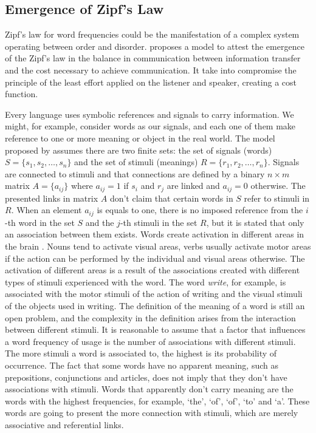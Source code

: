 \subsection{Emergence of Zipf's Law}
Zipf’s law for word frequencies could be the manifestation of a complex system 
operating between order and disorder. \cite{ramon2003,cancho2005} proposes a model to attest the
emergence of the Zipf's law in the balance in communication between information
transfer and the cost necessary to achieve communication. It take into compromise the principle of the least 
effort applied on the listener and speaker, creating a cost function.

Every language uses symbolic references and signals to carry information.
We might, for example, consider words as our signals, and each one of them
make reference to one or more meaning or object in the real world.
The model proposed by \cite{ramon2003,cancho2005} assumes there are two finite sets:
the set of signals (words) $S = \{ s_1, s_2, \ldots , s_n \}$ and the set of 
stimuli (meanings) $R = \{ r_1, r_2, \ldots , r_n \}$. Signals are connected
to stimuli and that connections are defined by a binary $n \times m$ matrix
$A = \{ a_{ij} \}$ where $a_{ij} = 1$ if $s_i$ and $r_j$ are linked and
$a_{ij} = 0$ otherwise. The presented links in matrix $A$ don't claim that certain
words in $S$ refer to stimuli in $R$. When an element $a_{ij}$ is equals to one,
there is no imposed reference from the $i$-th word in the set $S$ and the
$j$-th stimuli in the set $R$, but it is stated that only an association between them exists.
Words create activation in different areas in the brain \citep{pulvermuller2003}. 
Nouns tend to activate
visual areas, verbs usually activate motor areas if the action can be performed by
the individual and visual areas otherwise. The activation of different areas is
a result of the associations created with different types of stimuli experienced with
the word. The word \textit{write}, for example, is associated with the motor stimuli
of the action of writing and the visual stimuli of the objects used in writing.
The definition of the meaning of a word is still an open problem, and the complexity
in the definition arises from the interaction between different stimuli.
It is reasonable to assume that a factor that influences a word frequency of usage
is the number of associations with different stimuli. The more stimuli a word is
associated to, the highest is its probability of occurrence. The fact that some 
words have no apparent meaning, such as prepositions, conjunctions and articles, 
does not imply that they don't have associations with stimuli. Words that apparently
don't carry meaning are the words with the highest frequencies, for example,
`the', `of', `of', `to' and `a'. These words are going to present the more connection
 with stimuli, which are merely associative and referential links.

